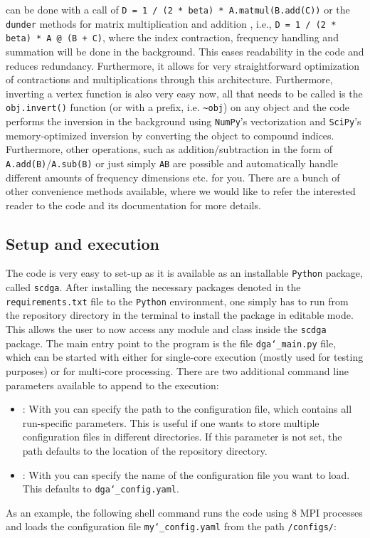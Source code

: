 \documentclass[../../main.tex]{subfiles}
\begin{document}
can be done with a call of \texttt{D = 1 / (2 * beta) * A.matmul(B.add(C))} or the \texttt{dunder} methods for matrix multiplication  and addition \say{\texttt{+}}, i.e., \texttt{D = 1 / (2 * beta) * A @ (B + C)}, where the index contraction, frequency handling and summation will be done in the background. This eases readability in the code and reduces redundancy. Furthermore, it allows for very straightforward optimization of contractions and multiplications through this architecture. Furthermore, inverting a vertex function is also very easy now, all that needs to be called is the \texttt{obj.invert()} function (or with a \say{\sim} prefix, i.e. \texttt{\sim obj}) on any object and the code performs the inversion in the background using \texttt{NumPy}'s vectorization and \texttt{SciPy}'s memory-optimized inversion by converting the object to compound indices. Furthermore, other operations, such as addition/subtraction in the form of \texttt{A.add(B)}/\texttt{A.sub(B)} or just simply \texttt{A\pm B} are possible and automatically handle different amounts of frequency dimensions etc. for you. There are a bunch of other convenience methods available, where we would like to refer the interested reader to the code and its documentation for more details.


\subsection{Setup and execution}

The code is very easy to set-up as it is available as an installable \texttt{Python} package, called \texttt{scdga}. After installing the necessary packages denoted in the \texttt{requirements.txt} file to the \texttt{Python} environment, one simply has to run  from the repository directory in the terminal to install the package in editable mode. This allows the user to now access any module and class inside the \texttt{scdga} package. The main entry point to the program is the file \texttt{dga\char`_main.py} file, which can be started with either  for single-core execution (mostly used for testing purposes) or \mbox{} for multi-core processing. There are two additional command line parameters available to append to the execution:
\begin{itemize}
\item{}: With  you can specify the path to the configuration file, which contains all run-specific parameters. This is useful if one wants to store multiple configuration files in different directories. If this parameter is not set, the path defaults to the location of the repository directory.
\item{}: With  you can specify the name of the configuration file you want to load. This defaults to \texttt{dga\char`_config.yaml}.
\end{itemize}
As an example, the following shell command runs the code using 8 MPI processes and loads the configuration file \texttt{my\char`_config.yaml} from the path \texttt{/configs/}:
\end{document}

